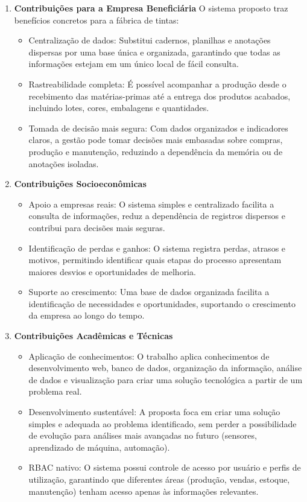 \documentclass[12pt,a4paper]{article}
\begin{document}
\begin{enumerate}
\item \textbf{Contribuições para a Empresa Beneficiária}
O sistema proposto traz benefícios concretos para a fábrica de tintas:

\begin{itemize}
\item Centralização de dados: Substitui cadernos, planilhas e anotações dispersas por uma base única e organizada, garantindo que todas as informações estejam em um único local de fácil consulta.
\item Rastreabilidade completa: É possível acompanhar a produção desde o recebimento das matérias-primas até a entrega dos produtos acabados, incluindo lotes, cores, embalagens e quantidades.
\item Tomada de decisão mais segura: Com dados organizados e indicadores claros, a gestão pode tomar decisões mais embasadas sobre compras, produção e manutenção, reduzindo a dependência da memória ou de anotações isoladas.
\end{itemize}

\item \textbf{Contribuições Socioeconômicas}
\begin{itemize}
\item Apoio a empresas reais: O sistema simples e centralizado facilita a consulta de informações, reduz a dependência de registros dispersos e contribui para decisões mais seguras.
\item Identificação de perdas e ganhos: O sistema registra perdas, atrasos e motivos, permitindo identificar quais etapas do processo apresentam maiores desvios e oportunidades de melhoria.
\item Suporte ao crescimento: Uma base de dados organizada facilita a identificação de necessidades e oportunidades, suportando o crescimento da empresa ao longo do tempo.
\end{itemize}

\item \textbf{Contribuições Acadêmicas e Técnicas}
\begin{itemize}
\item Aplicação de conhecimentos: O trabalho aplica conhecimentos de desenvolvimento web, banco de dados, organização da informação, análise de dados e visualização para criar uma solução tecnológica a partir de um problema real.
\item Desenvolvimento sustentável: A proposta foca em criar uma solução simples e adequada ao problema identificado, sem perder a possibilidade de evolução para análises mais avançadas no futuro (sensores, aprendizado de máquina, automação).
\item RBAC nativo: O sistema possui controle de acesso por usuário e perfis de utilização, garantindo que diferentes áreas (produção, vendas, estoque, manutenção) tenham acesso apenas às informações relevantes.
\end{itemize}
\end{enumerate}
\end{document}
